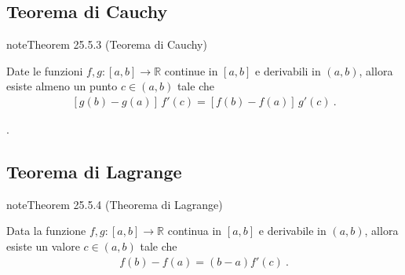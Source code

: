 \documentclass[letterpaper,10pt,italian]{jupyterBook}
\begin{document}
\subsection{Teorema di Cauchy}
\label{\detokenize{ch/infinitesimal_calculus/derivatives:teorema-di-cauchy}}\label{\detokenize{ch/infinitesimal_calculus/derivatives:infinitesimal-calculus-derivatives-thm-cauchy}}\label{ch/infinitesimal_calculus/derivatives:thm:infinitesimal-calculus:derivatives:thm:cauchy}
\begin{sphinxadmonition}{note}{Theorem 25.5.3 (Teorema di Cauchy)}



\sphinxAtStartPar
Date le funzioni \(f, g: [a,b] \rightarrow \mathbb{R}\) continue in \([a,b]\) e derivabili in \((a,b)\), allora esiste almeno un punto \(c \in (a,b)\) tale che
\begin{equation*}
\begin{split}\left[ g(b) - g(a) \right] \, f'(c) = \left[ f(b) - f(a) \right] \, g'(c) \ .\end{split}
\end{equation*}\end{sphinxadmonition}

\sphinxAtStartPar
{\hyperref[\detokenize{ch/infinitesimal_calculus/derivatives-notes:infinitesimal-calculus-derivatives-thm-cauchy-notes}]{}}.


\subsection{Teorema di Lagrange}
\label{\detokenize{ch/infinitesimal_calculus/derivatives:teorema-di-lagrange}}\label{\detokenize{ch/infinitesimal_calculus/derivatives:infinitesimal-calculus-derivatives-thm-lagrange}}\label{ch/infinitesimal_calculus/derivatives:thm:infinitesimal-calculus:derivatives:thm:lagrange}
\begin{sphinxadmonition}{note}{Theorem 25.5.4 (Theorema di Lagrange)}



\sphinxAtStartPar
Data la funzione \(f, g: [a,b] \rightarrow \mathbb{R}\) continua in \([a,b]\) e derivabile in \((a,b)\), allora esiste un valore \(c \in (a,b)\) tale che
\begin{equation*}
\begin{split}f(b) - f(a) = (b -  a) f'(c) \ .\end{split}
\end{equation*}\end{sphinxadmonition}
\end{document}
